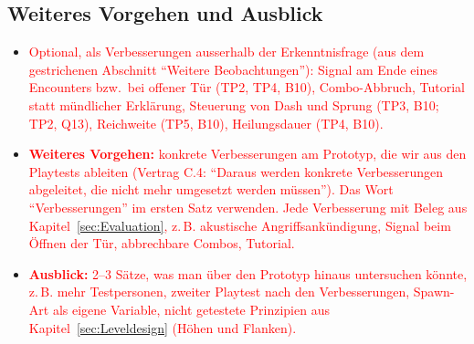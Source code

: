 \documentclass[../Main.tex]{subfiles}
\begin{document}
\subsection{Weiteres Vorgehen und Ausblick} \label{sec:Verbesserungen}

\begin{itemize}[leftmargin=1.5cm]
    \item \textcolor{red}{Optional, als Verbesserungen ausserhalb der Erkenntnisfrage (aus dem gestrichenen Abschnitt \enquote{Weitere Beobachtungen}): Signal am Ende eines Encounters bzw.\ bei offener Tür (TP2, TP4, B10), Combo-Abbruch, Tutorial statt mündlicher Erklärung, Steuerung von Dash und Sprung (TP3, B10; TP2, Q13), Reichweite (TP5, B10), Heilungsdauer (TP4, B10).}
\end{itemize}

\begin{itemize}[leftmargin=1.5cm]
    \item \textcolor{red}{\textbf{Weiteres Vorgehen:} konkrete Verbesserungen am Prototyp, die wir aus den Playtests ableiten (Vertrag C.4: \enquote{Daraus werden konkrete Verbesserungen abgeleitet, die nicht mehr umgesetzt werden müssen}). Das Wort \enquote{Verbesserungen} im ersten Satz verwenden. Jede Verbesserung mit Beleg aus Kapitel~\ref{sec:Evaluation}, z.\,B. akustische Angriffsankündigung, Signal beim Öffnen der Tür, abbrechbare Combos, Tutorial.}
    \item \textcolor{red}{\textbf{Ausblick:} 2--3 Sätze, was man über den Prototyp hinaus untersuchen könnte, z.\,B. mehr Testpersonen, zweiter Playtest nach den Verbesserungen, Spawn-Art als eigene Variable, nicht getestete Prinzipien aus Kapitel~\ref{sec:Leveldesign} (Höhen und Flanken).}
\end{itemize}
\end{document}
